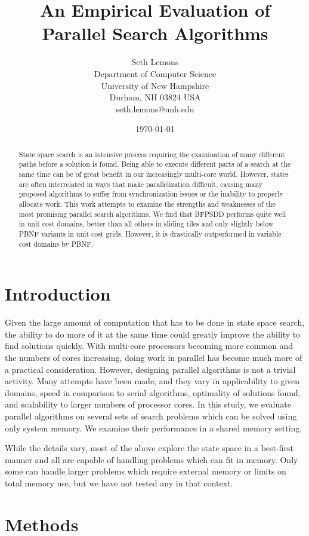 \documentclass{article}
\title{An Empirical Evaluation of Parallel Search Algorithms}
\author{Seth Lemons \\
Department of Computer Science \\
University of New Hampshire \\
Durham, NH 03824 USA \\
seth.lemons@unh.edu}
\date{\today}
\begin{document}
\maketitle

\begin{abstract}
State space search is an intensive process requiring the examination of many different paths before a solution is found. Being able to execute different parts of a search at the same time can be of great benefit in our increasingly multi-core world. However, states are often interrelated in ways that make parallelization difficult, causing many proposed algorithms to suffer from synchronization issues or the inability to properly allocate work. This work attempts to examine the strengths and weaknesses of the most promising parallel search algorithms. We find that BFPSDD performs quite well in unit cost domains, better than all others in sliding tiles and only slightly below PBNF variants in unit cost grids. However, it is drastically outperformed in variable cost domains by PBNF.
\end{abstract}

\section{Introduction}
Given the large amount of computation that has to be done in state space search, the ability to do more of it at the same time could greatly improve the ability to find solutions quickly. With multi-core processors becoming more common and the numbers of cores increasing, doing work in parallel has become much more of a practical consideration. However, designing parallel algorithms is not a trivial activity. Many attempts have been made, and they vary in applicability to given domains, speed in comparison to serial algorithms, optimality of solutions found, and scalability to larger numbers of processor cores. In this study, we evaluate parallel algorithms on several sets of search problems which can be solved using only system memory. We examine their performance in a shared memory setting.

While the details vary, most of the above explore the state space in a best-first manner and all are capable of handling problems which can fit in memory. Only some can handle larger problems which require external memory or limits on total memory use, but we have not tested any in that context.
\section{Methods}
\end{document}
